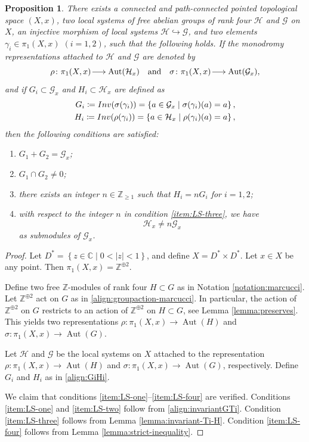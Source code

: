 \documentclass[a4paper,11pt,reqno]{amsart}
\makeatletter
\numberwithin{equation}{section}
\theoremstyle{plain}
\newtheorem{proposition}[theorem]{Proposition}
\theoremstyle{definition}
\newcommand{\Z}{\mathbb Z}
\newcommand{\C}{\mathbb C}
\let\rm\relax
\newcommand{\rm}[1]{{\mathrm{#1}}}
\newcommand{\Aut}{\operatorname{Aut}}
\newcommand{\ca}[1]{{\mathcal{#1}}}
\renewcommand{\longrightarrow}{\xymatrix@1@=15pt{\ar[r]&}}
\newcommand{\set}[1]{\left\{ #1 \right\}}
\newcommand{\va}[1]{\left| #1 \right|}
\makeatother
\begin{document}
\begin{proposition} \label{proposition:counterexample}
There exists a connected and path-connected pointed topological space $(X,x)$, two local systems of free abelian groups of rank four $\ca H$ and $\ca G$ on $X$, an injective morphism of local systems $\ca H \hookrightarrow \ca G$, and two elements $\gamma_i \in \pi_1(X,x)$ $(i = 1,2)$, such that the following holds. If the monodromy representations attached to $\ca H$ and $\ca G$ are denoted by 
\[
\rho \colon \pi_1(X,x) \longrightarrow \Aut(\ca H_x) \quad \text{and} \quad \sigma \colon \pi_1(X,x) \longrightarrow \Aut(\ca G_x), 
\]
and if $G_i \subset \ca G_x$ and $H_i \subset \ca H_x$ are defined as
\begin{align} \label{align:GiHi}
\begin{split}
G_i \coloneqq \rm{Inv}(\sigma(\gamma_i)) = \set{a \in \ca G_x \mid \sigma(\gamma_i)(a) = a}, \\
H_i \coloneqq \rm{Inv}(\rho(\gamma_i)) = \set{a \in \ca H_x \mid \rho(\gamma_i)(a) = a}, 
\end{split}
\end{align}
then the following conditions are satisfied: 
\begin{enumerate}
    \item \label{item:LS-one} $G_1 + G_2 = \ca G_x$;
    \item \label{item:LS-two} $G_1 \cap G_2 \neq 0$; 
    \item \label{item:LS-three} there exists an integer $n \in \Z_{\geq 1}$ such that $H_i = nG_i$ for $i  =1,2$;
    \item \label{item:LS-four} with respect to the integer $n$ in condition \eqref{item:LS-three}, we have
    \[
    \ca H_x \neq n \ca G_x
    \]
    as submodules of $\ca G_x$. 
\end{enumerate}
\end{proposition}
\begin{proof}
Let $D^\ast  = \set{z \in \C \mid 0 < \va{z} < 1}$, and define $X = D^\ast \times D^\ast$. Let $x \in X$ be any point. Then $\pi_1(X,x) = \Z^{\oplus 2}$. 

Define two free $\Z$-modules of rank four $H \subset G$ as in Notation \ref{notation:marcucci}. Let $\Z^{\oplus 2}$ act on $G$ as in \eqref{align:groupaction-marcucci}. In particular, the action of $\Z^{\oplus 2}$ on $G$ restricts to an action of $\Z^{\oplus 2}$ on $H \subset G$, see Lemma \ref{lemma:preserves}. This yields two representations $\rho \colon \pi_1(X,x) \to \Aut(H)$ and $\sigma \colon \pi_1(X,x) \to \Aut(G)$. 

Let $\ca H$ and $\ca G$ be the local systems on $X$ attached to the representation $\rho \colon \pi_1(X,x) \to \Aut(H)$ and $\sigma \colon \pi_1(X,x) \to \Aut(G)$, respectively. Define $G_i$ and $H_i$ as in \eqref{align:GiHi}. 

We claim that conditions \eqref{item:LS-one}--\eqref{item:LS-four} are verified. Conditions \eqref{item:LS-one} and \eqref{item:LS-two} follow from \eqref{align:invariantGTi}. Condition \eqref{item:LS-three} follows from Lemma \ref{lemma:invariant-Ti-H}. Condition \eqref{item:LS-four} follows from Lemma \ref{lemma:strict-inequality}. 
\end{proof} 
\end{document}
